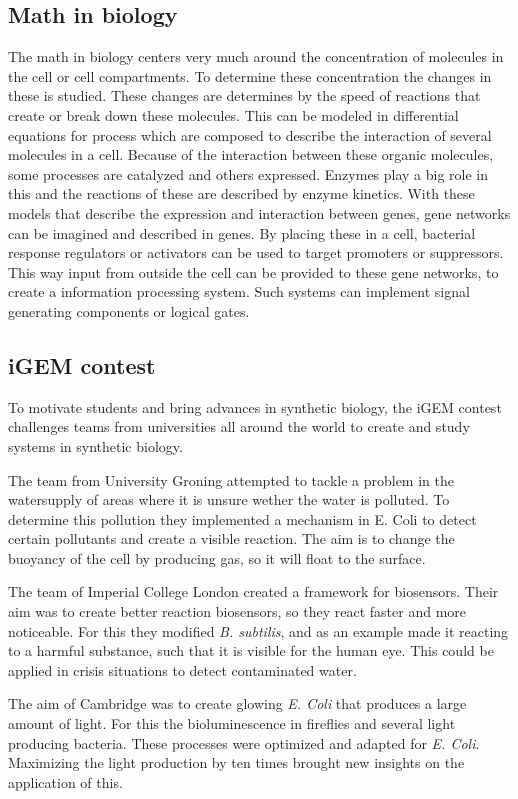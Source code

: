 \documentclass[a4paper]{article}
\begin{document}
\subsection{Math in biology}
The math in biology centers very much around the concentration of molecules in the cell or cell compartments. To determine these concentration the changes in these is studied. These changes are  determines by the speed of reactions that create or break down these molecules. This can be modeled in differential equations for process which are composed to describe the interaction of several molecules in a cell. Because of the interaction between these organic molecules, some processes are catalyzed and others expressed. Enzymes play a big role in this and the reactions of these are described by enzyme kinetics. With these models that describe the expression and interaction between genes, gene networks can be imagined and described in genes. By placing these in a cell, bacterial response regulators or activators can be used to target promoters or suppressors. This way input from outside the cell can be provided to these gene networks, to create a information processing system. Such systems can implement signal generating components or logical gates.

\subsection{iGEM contest}

To motivate students and bring advances in synthetic biology, the iGEM contest challenges teams from universities all around the world to create and study systems in synthetic biology.

The team from University Groning attempted to tackle a problem in the watersupply of areas where it is unsure wether the water is polluted. To determine this pollution they implemented a mechanism in E. Coli to detect certain pollutants and create a visible reaction. The aim is to change the buoyancy of the cell by producing gas, so it will float to the surface.

The team of Imperial College London created a framework for biosensors. Their aim was to create better reaction biosensors, so they react faster and more noticeable. For this they modified \textit{B. subtilis}, and as an example made it reacting to a harmful substance, such that it is visible for the human eye. This could be applied in crisis situations to detect contaminated water.

The aim of Cambridge was to create glowing \textit{E. Coli} that produces a large amount of light. For this the bioluminescence in fireflies and several light producing bacteria. These processes were optimized and adapted for \textit{E. Coli}. Maximizing the light production by ten times brought new insights on the application of this.
\end{document}
